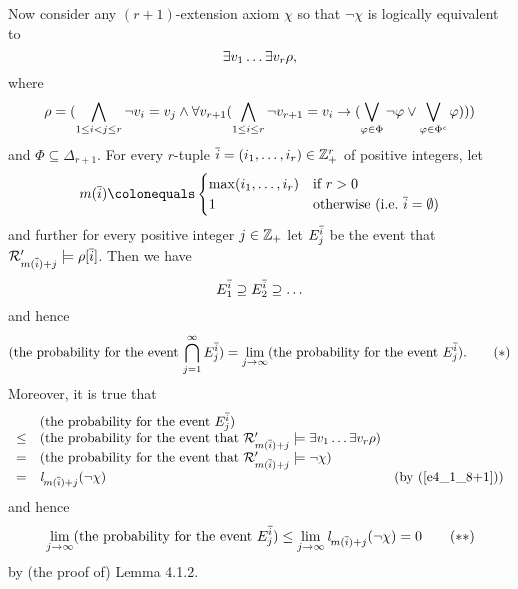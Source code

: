 \begin{enumerate}[1.]
Now consider any $(r + 1)$-extension axiom $\chi$ so that $\neg\chi$ is logically equivalent to
\[
\exists v_1 \ldots \exists v_r \rho,
\]
where
\[
\rho = (\bigwedge_{1 \leq i < j \leq r} \neg v_i = v_j \land \forall v_{r + 1} (\bigwedge_{1 \leq i \leq r} \neg v_{r + 1} = v_i \rightarrow (\bigvee_{\varphi \in \Phi} \neg\varphi \lor \bigvee_{\varphi \in \Phi^\mathit{c}} \varphi)))
\]
and $\Phi \subseteq \Delta_{r + 1}$. For every $r$-tuple $\overline{i} = (i_1, \ldots, i_r) \in \mathbb{Z}_+^{r}$ of positive integers, let
\[
m(\vect{i}) \defas
\begin{cases}
\max(i_1, \etc, i_r) & \text{if \mathmode{r > 0}} \cr
1                    & \text{otherwise (i.e.\ \mathmode{\vect{i} = \emptyseq})} \cr
\end{cases}
\]
and further for every positive integer $j \in \mathbb{Z}_+$ let $E^{\overline{i}}_j$ be the event that $\mathcal{R}'_{m(\overline{i}) + j} \models \rho[\overline{i}]$. Then we have
\[
E^{\overline{i}}_1 \supseteq E^{\overline{i}}_2 \supseteq \ldots
\]
and hence
\begin{equation}\label{e4_1_8+2}
(\text{the probability for the event \mathmode{\bintsc^\infty_{j = 1} E^{\vect{i}}_j}}) = \lim_{j \to \infty} (\text{the probability for the event \mathmode{E^{\vect{i}}_j}}). \tag{$\ast$}
\end{equation}
Moreover, it is true that
\[
\begin{array}{lll}
\    & (\text{the probability for the event \mathmode{E^{\vect{i}}_j}}) & \cr
\leq & (\text{the probability for the event that \mathmode{\strct{R}'_{m(\vect{i}) + j} \satis \exists v_1 \etc \exists v_r \rho}}) & \cr
=    & (\text{the probability for the event that \mathmode{\strct{R}'_{m(\vect{i}) + j} \satis \neg\chi}}) & \cr
=    & \lprob[m(\vect{i}) + j](\neg\chi) & \text{(by (\ref{e4_1_8+1}))} \cr
\end{array} 
\]
and hence
\begin{equation}\label{e4_1_8+3}
\lim_{j \to \infty} (\text{the probability for the event \mathmode{E^{\vect{i}}_j}}) \leq \lim_{j \to \infty} \lprob[m(\vect{i}) + j](\neg\chi) = 0 \tag{$\ast\ast$}
\end{equation}
by (the proof of) Lemma 4.1.2.


\end{enumerate}
